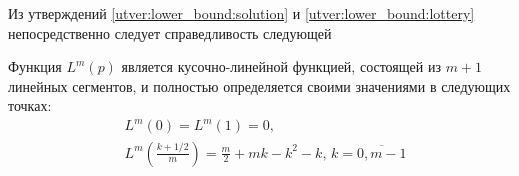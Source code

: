 Из утверждений \ref{utver:lower_bound:solution} и \ref{utver:lower_bound:lottery} непосредственно следует справедливость следующей

\begin{lemma}
\label{lemma:lower_bound:function}
Функция $ L^m(p) $ является кусочно-линейной функцией, состоящей из $ m + 1 $ линейных сегментов, и полностью определяется своими значениями в следующих точках:
\begin{eqnarray*}
& L^m(0) = L^m(1) = 0, \\
& L^m\left(\frac{k+1/2}{m}\right) 
    = \frac{m}{2} + mk - k^2 - k, 
        \, k = \overline{0, m - 1}
\end{eqnarray*}
\end{lemma}